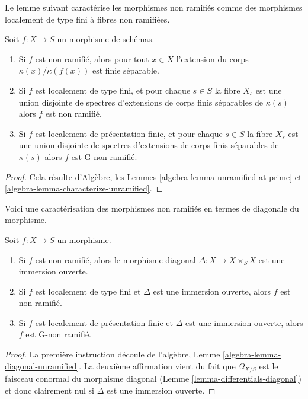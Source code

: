 \noindent
Le lemme suivant caractérise les morphismes non ramifiés comme des
morphismes localement de type fini à fibres non ramifiées.

\begin{lemma}
\label{lemma-unramified-etale-fibres}
Soit $f : X \to S$ un morphisme de schémas.
\begin{enumerate}
\item Si $f$ est non ramifié, alors pour tout $x \in X$ l'extension
du corps $\kappa(x)/\kappa(f(x))$ est finie séparable.
\item Si $f$ est localement de type fini, et pour chaque
$s \in S$ la fibre $X_s$ est une union disjointe de spectres d'extensions de corps finis
séparables de $\kappa(s)$ alors $f$ est non ramifié.
\item Si $f$ est localement de présentation finie, et pour chaque
$s \in S$ la fibre $X_s$ est une union disjointe de spectres d'extensions de corps
finis séparables de $\kappa(s)$ alors $f$ est G-non ramifié.
\end{enumerate}
\end{lemma}

\begin{proof}
Cela résulte d'Algèbre,
les Lemmes \ref{algebra-lemma-unramified-at-prime}
et \ref{algebra-lemma-characterize-unramified}.
\end{proof}

\noindent
Voici une caractérisation des morphismes non ramifiés en termes de diagonale
du morphisme.

\begin{lemma}
\label{lemma-diagonal-unramified-morphism}
Soit $f : X \to S$ un morphisme.
\begin{enumerate}
\item Si $f$ est non ramifié, alors le morphisme
diagonal $\Delta : X \to X \times_S X$ est une immersion ouverte.
\item Si $f$ est localement de type fini et
$\Delta$ est une immersion ouverte, alors $f$ est non ramifié.
\item Si $f$ est localement de présentation finie et $\Delta$ est une immersion
ouverte, alors $f$ est G-non ramifié.
\end{enumerate}
\end{lemma}

\begin{proof}
La première instruction découle
de l'algèbre, Lemme \ref{algebra-lemma-diagonal-unramified}. La deuxième
affirmation vient du fait que $\Omega_{X/S}$ est le
faisceau conormal du morphisme diagonal
(Lemme \ref{lemma-differentials-diagonal}) et donc clairement
nul si $\Delta$ est une immersion ouverte.
\end{proof}

